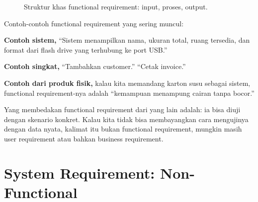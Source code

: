 \documentclass[11pt,a4paper]{article}
\begin{document}
\begin{figure}[H]
	\centering
	\caption{Struktur khas functional requirement: input, proses, output.}
	\label{fig:fn-io}
\end{figure}

Contoh-contoh functional requirement yang sering muncul:

\textbf{Contoh sistem,} ``Sistem menampilkan nama, ukuran total, ruang tersedia, dan format dari flash drive yang terhubung ke port USB.''

\textbf{Contoh singkat,} ``Tambahkan customer.'' ``Cetak invoice.''

\textbf{Contoh dari produk fisik,} kalau kita memandang karton susu sebagai sistem, functional requirement-nya adalah ``kemampuan menampung cairan tanpa bocor.''

Yang membedakan functional requirement dari yang lain adalah: ia bisa diuji dengan skenario konkret. Kalau kita tidak bisa membayangkan cara mengujinya dengan data nyata, kalimat itu bukan functional requirement, mungkin masih user requirement atau bahkan business requirement.

\section{System Requirement: Non-Functional}
\end{document}
